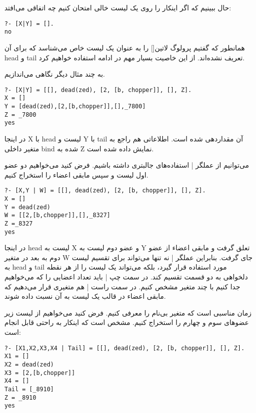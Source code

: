 حال ببینیم که اگر اینکار را روی یک لیست خالی امتحان کنیم چه اتفاقی می‌افتد:

\begin{latin}
\begin{lstlisting}
?- [X|Y] = [].
no
\end{lstlisting}
\end{latin}

همانطور که گفتیم پرولوگ ‌لاتین{[]} را به عنوان یک لیست خاص می‌شناسد که برای آن head و tail تعریف نشده‌اند. از این خاصیت بسیار مهم در ادامه استفاده خواهیم کرد.

به چند مثال دیگر نگاهی می‌اندازیم.

\begin{latin}
\begin{lstlisting}
?- [X|Y] = [[], dead(zed), [2, [b, chopper]], [], Z].
X = []
Y = [dead(zed),[2,[b,chopper]],[],_7800]
Z = _7800
yes
\end{lstlisting}
\end{latin}

در اینجا X با head لیست و Y با tail آن مقداردهی شده است. اطلاعاتی هم راجع به متغیر داخلی bind شده به Z نمایش داده شده است.

می‌توانیم از عملگر | استفاده‌های جالبتری داشته باشیم. فرض کنید می‌خواهیم دو عضو اول لیست و سپس مابقی اعضاء را استخراج کنیم.

\begin{latin}
\begin{lstlisting}
?- [X,Y | W] = [[], dead(zed), [2, [b, chopper]], [], Z].
X = []
Y = dead(zed)
W = [[2,[b,chopper]],[],_8327]
Z =_8327
yes
\end{lstlisting}
\end{latin}

در اینجا head لیست به X و عضو دوم لیست به Y تعلق گرفت و مابقی اعضاء از عضو دوم به بعد در متغیر W جای گرفت. بنابراین عملگر | نه تنها می‌تواند برای تقسیم لیست به head و tail مورد استفاده قرار گیرد، بلکه می‌تواند یک لیست را از هر نقطه دلخواهی به دو قسمت تقسیم کند. در سمت چپ | باید تعداد اعضایی را که می‌خواهیم جدا کنیم با چند متغیر مشخص کنیم. در سمت راست | هم متغیری قرار می‌دهیم که مابقی اعضاء‌ در قالب یک لیست به آن نسبت داده شوند.

زمان مناسبی است که متغیر بی‌نام را معرفی کنیم. فرض کنید می‌خواهیم از لیست زیر عضوهای سوم و چهارم را استخراج کنیم. مشخص است که اینکار به راحتی قابل انجام است:

\begin{latin}
\begin{lstlisting}
?- [X1,X2,X3,X4 | Tail] = [[], dead(zed), [2, [b, chopper]], [], Z].
X1 = []
X2 = dead(zed)
X3 = [2,[b,chopper]]
X4 = []
Tail = [_8910]
Z = _8910
yes
\end{lstlisting}
\end{latin}

